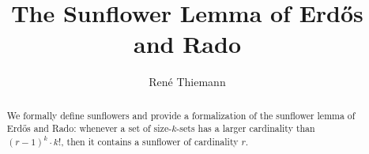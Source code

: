 \documentclass[11pt,a4paper]{article}
\begin{document}
\title{The Sunflower Lemma of Erdős and Rado}
\author{René Thiemann}
\maketitle

\begin{abstract}
We formally define sunflowers and provide a formalization of
the sunflower lemma of Erdős and Rado: whenever a set of size-$k$-sets has a larger cardinality 
than $(r - 1)^k \cdot k!$, then it contains a sunflower of cardinality $r$.
\end{abstract}





\end{document}
